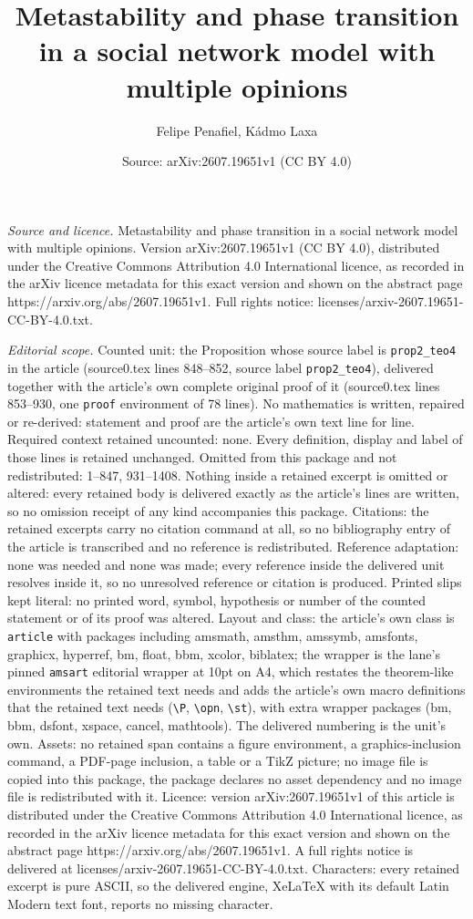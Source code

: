 \documentclass[10pt,a4paper]{amsart}
\title[Metastability and phase transition in a social network model]{Metastability and phase transition in a social network model with multiple opinions}
\author{Felipe Penafiel, K\'admo Laxa}
\date{Source: arXiv:2607.19651v1 (CC BY 4.0)}
\begin{document}
\maketitle

\noindent\emph{Source and licence.} Metastability and phase transition in a social network model with multiple opinions. Version arXiv:2607.19651v1 (CC BY 4.0), distributed under the Creative Commons Attribution 4.0 International licence, as recorded in the arXiv licence metadata for this exact version and shown on the abstract page https://arxiv.org/abs/2607.19651v1. Full rights notice: licenses/arxiv-2607.19651-CC-BY-4.0.txt.\par\smallskip

\noindent\textit{Editorial scope.} Counted unit: the Proposition whose source label is \texttt{prop2\_teo4} in the article (source0.tex lines 848--852, source label \texttt{prop2\_teo4}), delivered together with the article's own complete original proof of it (source0.tex lines 853--930, one \texttt{proof} environment of 78 lines). No mathematics is written, repaired or re-derived: statement and proof are the article's own text line for line. Required context retained uncounted: none. Every definition, display and label of those lines is retained unchanged. Omitted from this package and not redistributed: 1--847, 931--1408. Nothing inside a retained excerpt is omitted or altered: every retained body is delivered exactly as the article's lines are written, so no omission receipt of any kind accompanies this package. Citations: the retained excerpts carry no citation command at all, so no bibliography entry of the article is transcribed and no reference is redistributed. Reference adaptation: none was needed and none was made; every reference inside the delivered unit resolves inside it, so no unresolved reference or citation is produced. Printed slips kept literal: no printed word, symbol, hypothesis or number of the counted statement or of its proof was altered. Layout and class: the article's own class is \texttt{article} with packages including amsmath, amsthm, amssymb, amsfonts, graphicx, hyperref, bm, float, bbm, xcolor, biblatex; the wrapper is the lane's pinned \texttt{amsart} editorial wrapper at 10pt on A4, which restates the theorem-like environments the retained text needs and adds the article's own macro definitions that the retained text needs (\texttt{\textbackslash P}, \texttt{\textbackslash opn}, \texttt{\textbackslash st}), with extra wrapper packages (bm, bbm, dsfont, xspace, cancel, mathtools). The delivered numbering is the unit's own. Assets: no retained span contains a figure environment, a graphics-inclusion command, a PDF-page inclusion, a table or a TikZ picture; no image file is copied into this package, the package declares no asset dependency and no image file is redistributed with it. Licence: version arXiv:2607.19651v1 of this article is distributed under the Creative Commons Attribution 4.0 International licence, as recorded in the arXiv licence metadata for this exact version and shown on the abstract page https://arxiv.org/abs/2607.19651v1. A full rights notice is delivered at licenses/arxiv-2607.19651-CC-BY-4.0.txt. Characters: every retained excerpt is pure ASCII, so the delivered engine, XeLaTeX with its default Latin Modern text font, reports no missing character.
\end{document}
